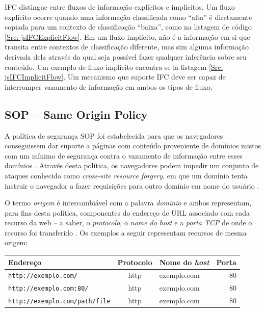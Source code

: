 IFC distingue entre fluxos de informação explícitos e implícitos. Um fluxo explícito ocorre quando uma informação classificada como ``alta'' é diretamente copiada para um contexto de classificação ``baixa'', como na listagem de código \ref{Src: jsIFCExplicitFlow}. Em um fluxo implícito, não é a informação em si que transita entre contextos de classificação diferente, mas sim alguma informação derivada dela através da qual seja possível fazer qualquer inferência sobre seu conteúdo. Um exemplo de fluxo implícito encontra-se la listagem \ref{Src: jsIFCImplicitFlow}. Um mecanismo que suporte IFC deve ser capaz de interromper vazamento de informação em ambos os tipos de fluxo.






\subsection{SOP -- Same Origin Policy}
A política de segurança SOP foi estabelecida para que os navegadores conseguissem dar suporte a páginas com conteúdo proveniente de domínios mistos com um mínimo de segurança contra o vazamento de informação entre esses domínios \cite{Hill2016}. Através desta política, os navegadores podem impedir um conjunto de ataques conhecido como \textit{cross-site resource forgery}, em que um domínio tenta instruir o navegador a fazer requisições para outro domínio em nome do usuário \cite{OWASP:CSRF}.

O termo \textit{origem} é intercambiável com a palavra \textit{domínio} e ambos representam, para fins desta política, componentes do endereço de URL associado com cada recurso da web -- a saber, o \textit{protocolo}, o \textit{nome do host} e a \textit{porta TCP} de onde o recurso foi transferido \cite{Barth2011}. Os exemplos a seguir representam recursos de mesma origem:

{
	\small \begin{tabular}{|l|c|l|r|}
		\hline 
		Endereço & Protocolo & Nome do \textit{host} & Porta \\ 
		\hline 
		\texttt{http://exemplo.com/} & http & exemplo.com & 80 \\ 
		\hline 
		\texttt{http://exemplo.com:80/} & http & exemplo.com & 80 \\ 
		\hline 
		\texttt{http://exemplo.com/path/file} & http & exemplo.com & 80 \\ 
		\hline 
	\end{tabular}
}


